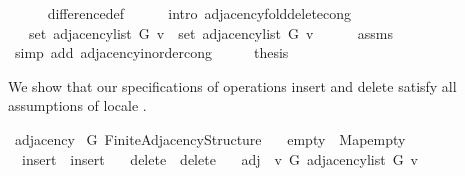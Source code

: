 \begin{isabellebody}
\ \ \ \ \isamarkupfalse%
\ difference{\isacharunderscore}{\kern0pt}def\isanewline
\ \ \ \ \isamarkupfalse%
\ {\isacharparenleft}{\kern0pt}intro\ adjacency{\isacharunderscore}{\kern0pt}fold{\isacharunderscore}{\kern0pt}delete{\isacharunderscore}{\kern0pt}{}{\isacharunderscore}{\kern0pt}cong{\isacharparenright}{\kern0pt}\isanewline
\ \ \isamarkupfalse%
\ \isamarkupfalse%
\ {\isachardoublequoteopen}{\isachardot}{\kern0pt}{\isachardot}{\kern0pt}{\isachardot}{\kern0pt}\ {\isacharequal}{\kern0pt}\ set\ {\isacharparenleft}{\kern0pt}adjacency{\isacharunderscore}{\kern0pt}list\ G{}\ v{\isacharparenright}{\kern0pt}\ {\isacharminus}{\kern0pt}\ set\ {\isacharparenleft}{\kern0pt}adjacency{\isacharunderscore}{\kern0pt}list\ G{}\ v{\isacharparenright}{\kern0pt}{\isachardoublequoteclose}\isanewline
\ \ \ \ \isamarkupfalse%
\ assms{\isacharparenleft}{\kern0pt}{}{\isacharparenright}{\kern0pt}\isanewline
\ \ \ \ \isamarkupfalse%
\ {\isacharparenleft}{\kern0pt}simp\ add{\isacharcolon}{\kern0pt}\ adjacency{\isacharunderscore}{\kern0pt}inorder{\isacharunderscore}{\kern0pt}cong{\isacharparenright}{\kern0pt}\isanewline
\ \ \isamarkupfalse%
\ \isamarkupfalse%
\ {\isacharquery}{\kern0pt}thesis\isanewline
\ \ \ \ \isacommand{{\isachardot}{\kern0pt}}\isamarkupfalse%
\isanewline
{}\isamarkupfalse%
%
\endisatagproof
{\isafoldproof}%
%
\isadelimproof
%
\endisadelimproof
%
\begin{isamarkuptext}%
We show that our specifications of operations insert and delete satisfy all assumptions of locale
.%
\end{isamarkuptext}\isamarkuptrue%
\isamarkupfalse%
\ adjacency\isanewline
{}\isanewline
{}\isamarkupfalse%
\ G{\isacharcolon}{\kern0pt}\ Finite{\isacharunderscore}{\kern0pt}Adjacency{\isacharunderscore}{\kern0pt}Structure\ \isanewline
\ \ empty\ {\isacharequal}{\kern0pt}\ Map{\isacharunderscore}{\kern0pt}empty\ \isanewline
\ \ insert\ {\isacharequal}{\kern0pt}\ insert{\isacharprime}{\kern0pt}\ \isanewline
\ \ delete\ {\isacharequal}{\kern0pt}\ delete{\isacharprime}{\kern0pt}\ \isanewline
\ \ adj\ {\isacharequal}{\kern0pt}\ {\isachardoublequoteopen}{\isacharparenleft}{\kern0pt}{\isasymlambda}v\ G{\isachardot}{\kern0pt}\ adjacency{\isacharunderscore}{\kern0pt}list\ G\ v{\isacharparenright}{\kern0pt}{\isachardoublequoteclose}\ \isanewline

\end{isabellebody}
